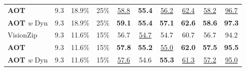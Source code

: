 \begin{table}[t]
{\begin{tabular}{l|ccc|cccc|cc}
 \textbf{AOT} & 9.3 & 18.9\% & 25\%
& \underline{58.8}  & \textbf{55.4} & \underline{56.2} & \underline{62.4} & \underline{58.2} & \underline{96.7} \\ %

 \textbf{AOT} \textit{w} Dyn & 9.3 & 18.9\% & 25\%
& \textbf{59.1}  & \textbf{55.4} & \textbf{57.1} & \textbf{62.6} & \textbf{58.6} & \textbf{97.3} \\ %


\hline

 VisionZip~\cite{yang2025visionzip} & 9.3 & 11.6\% & 15\%
& 56.7 & \underline{54.7} & 54.7 & 60.7 & 56.7 & 94.2 \\ %

 \textbf{AOT} & 9.3 & 11.6\% & 15\%
& \textbf{57.8}  & \textbf{55.2} & \underline{55.0} & \textbf{62.0} & \textbf{57.5} & \textbf{95.5} \\ %


 \textbf{AOT} \textit{w} Dyn & 9.3 & 11.6\% & 15\%
& \underline{57.6}  & 54.6 & \textbf{55.3} & \underline{61.3} & \underline{57.2} & \underline{95.0} \\ %

\bottomrule

\end{tabular}
}%
\label{tab:dynamic_diff_backbone}
\vspace{-0.4cm}
\end{table}



\begin{table}[tb]
\centering
\caption{Ablation: the impact of random token selection.}
\vspace{-0.2cm}
\label{tab:ablations_random}
\vspace{-0.4cm}
\end{table}


